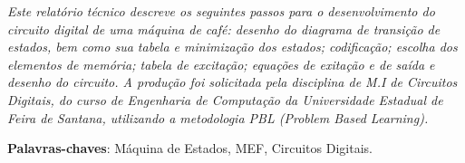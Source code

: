 \documentclass[
	11pt,				%
	openany,			%
	oneside,
	a4paper,			%
	chapter=TITLE,		%
	section=TITLE,		%
	english,			%
	brazil				%
	]{abntex2}
\begin{document}
\frenchspacing 
\textual
\pagestyle{uefs-pbl}
\imprimircabecalho
\begingroup
\let\clearpage\relax
\begin{resumoumacoluna}
\textit{Este relatório técnico descreve os seguintes passos para o desenvolvimento do circuito digital de uma máquina de café: desenho do diagrama de transição de estados, bem como sua tabela e minimização dos estados; codificação; escolha dos elementos de memória; tabela de excitação; equações de exitação e de saída e desenho do circuito. A produção foi solicitada pela disciplina de M.I de Circuitos Digitais, do curso de Engenharia de Computação da Universidade Estadual de Feira de Santana, utilizando a metodologia PBL (Problem Based Learning).}


 \vspace{\onelineskip}
 
 \noindent
 \textbf{Palavras-chaves}: Máquina de Estados, MEF, Circuitos Digitais.
\end{resumoumacoluna}










\postextual
\endgroup


\end{document}
